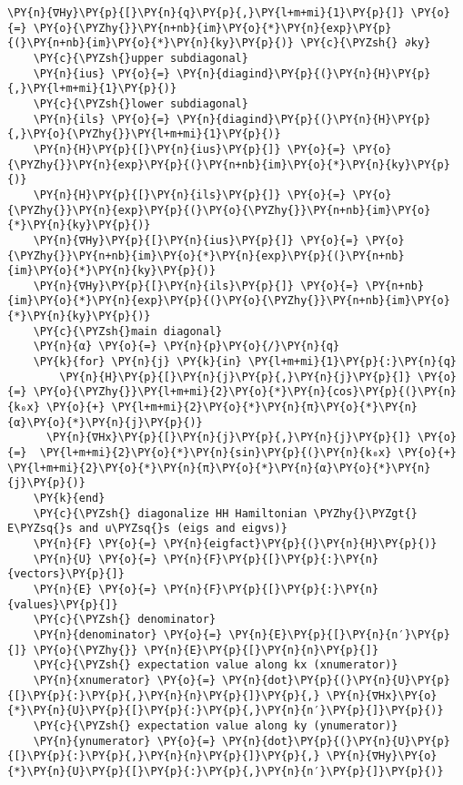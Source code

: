 \begin{Verbatim}[commandchars=\\\{\}]
    \PY{n}{∇Hy}\PY{p}{[}\PY{n}{q}\PY{p}{,}\PY{l+m+mi}{1}\PY{p}{]} \PY{o}{=} \PY{o}{\PYZhy{}}\PY{n+nb}{im}\PY{o}{*}\PY{n}{exp}\PY{p}{(}\PY{n+nb}{im}\PY{o}{*}\PY{n}{ky}\PY{p}{)} \PY{c}{\PYZsh{} ∂ky}
    \PY{c}{\PYZsh{}upper subdiagonal}
    \PY{n}{ius} \PY{o}{=} \PY{n}{diagind}\PY{p}{(}\PY{n}{H}\PY{p}{,}\PY{l+m+mi}{1}\PY{p}{)}
    \PY{c}{\PYZsh{}lower subdiagonal}
    \PY{n}{ils} \PY{o}{=} \PY{n}{diagind}\PY{p}{(}\PY{n}{H}\PY{p}{,}\PY{o}{\PYZhy{}}\PY{l+m+mi}{1}\PY{p}{)}
    \PY{n}{H}\PY{p}{[}\PY{n}{ius}\PY{p}{]} \PY{o}{=} \PY{o}{\PYZhy{}}\PY{n}{exp}\PY{p}{(}\PY{n+nb}{im}\PY{o}{*}\PY{n}{ky}\PY{p}{)}
    \PY{n}{H}\PY{p}{[}\PY{n}{ils}\PY{p}{]} \PY{o}{=} \PY{o}{\PYZhy{}}\PY{n}{exp}\PY{p}{(}\PY{o}{\PYZhy{}}\PY{n+nb}{im}\PY{o}{*}\PY{n}{ky}\PY{p}{)}
    \PY{n}{∇Hy}\PY{p}{[}\PY{n}{ius}\PY{p}{]} \PY{o}{=} \PY{o}{\PYZhy{}}\PY{n+nb}{im}\PY{o}{*}\PY{n}{exp}\PY{p}{(}\PY{n+nb}{im}\PY{o}{*}\PY{n}{ky}\PY{p}{)}
    \PY{n}{∇Hy}\PY{p}{[}\PY{n}{ils}\PY{p}{]} \PY{o}{=} \PY{n+nb}{im}\PY{o}{*}\PY{n}{exp}\PY{p}{(}\PY{o}{\PYZhy{}}\PY{n+nb}{im}\PY{o}{*}\PY{n}{ky}\PY{p}{)}
    \PY{c}{\PYZsh{}main diagonal}
    \PY{n}{α} \PY{o}{=} \PY{n}{p}\PY{o}{/}\PY{n}{q}
    \PY{k}{for} \PY{n}{j} \PY{k}{in} \PY{l+m+mi}{1}\PY{p}{:}\PY{n}{q}
        \PY{n}{H}\PY{p}{[}\PY{n}{j}\PY{p}{,}\PY{n}{j}\PY{p}{]} \PY{o}{=} \PY{o}{\PYZhy{}}\PY{l+m+mi}{2}\PY{o}{*}\PY{n}{cos}\PY{p}{(}\PY{n}{k₀x} \PY{o}{+} \PY{l+m+mi}{2}\PY{o}{*}\PY{n}{π}\PY{o}{*}\PY{n}{α}\PY{o}{*}\PY{n}{j}\PY{p}{)}
      \PY{n}{∇Hx}\PY{p}{[}\PY{n}{j}\PY{p}{,}\PY{n}{j}\PY{p}{]} \PY{o}{=}  \PY{l+m+mi}{2}\PY{o}{*}\PY{n}{sin}\PY{p}{(}\PY{n}{k₀x} \PY{o}{+} \PY{l+m+mi}{2}\PY{o}{*}\PY{n}{π}\PY{o}{*}\PY{n}{α}\PY{o}{*}\PY{n}{j}\PY{p}{)}
    \PY{k}{end}
    \PY{c}{\PYZsh{} diagonalize HH Hamiltonian \PYZhy{}\PYZgt{} E\PYZsq{}s and u\PYZsq{}s (eigs and eigvs)}
    \PY{n}{F} \PY{o}{=} \PY{n}{eigfact}\PY{p}{(}\PY{n}{H}\PY{p}{)}
    \PY{n}{U} \PY{o}{=} \PY{n}{F}\PY{p}{[}\PY{p}{:}\PY{n}{vectors}\PY{p}{]}
    \PY{n}{E} \PY{o}{=} \PY{n}{F}\PY{p}{[}\PY{p}{:}\PY{n}{values}\PY{p}{]}
    \PY{c}{\PYZsh{} denominator}
    \PY{n}{denominator} \PY{o}{=} \PY{n}{E}\PY{p}{[}\PY{n}{n′}\PY{p}{]} \PY{o}{\PYZhy{}} \PY{n}{E}\PY{p}{[}\PY{n}{n}\PY{p}{]}
    \PY{c}{\PYZsh{} expectation value along kx (xnumerator)}
    \PY{n}{xnumerator} \PY{o}{=} \PY{n}{dot}\PY{p}{(}\PY{n}{U}\PY{p}{[}\PY{p}{:}\PY{p}{,}\PY{n}{n}\PY{p}{]}\PY{p}{,} \PY{n}{∇Hx}\PY{o}{*}\PY{n}{U}\PY{p}{[}\PY{p}{:}\PY{p}{,}\PY{n}{n′}\PY{p}{]}\PY{p}{)}
    \PY{c}{\PYZsh{} expectation value along ky (ynumerator)}
    \PY{n}{ynumerator} \PY{o}{=} \PY{n}{dot}\PY{p}{(}\PY{n}{U}\PY{p}{[}\PY{p}{:}\PY{p}{,}\PY{n}{n}\PY{p}{]}\PY{p}{,} \PY{n}{∇Hy}\PY{o}{*}\PY{n}{U}\PY{p}{[}\PY{p}{:}\PY{p}{,}\PY{n}{n′}\PY{p}{]}\PY{p}{)}

\end{Verbatim}
